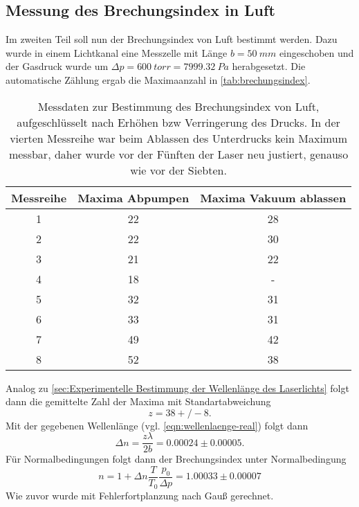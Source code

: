 \subsection{Messung des Brechungsindex in Luft}
\label{sec:Messung des Brechungsindex in Luft}
Im zweiten Teil soll nun der Brechungsindex von Luft bestimmt werden. Dazu wurde in
einem Lichtkanal eine Messzelle mit Länge $b = \SI{50}{mm}$ eingeschoben und der Gasdruck
wurde um $\Delta p = \SI{600}{torr} = \SI{7999,32}{Pa}$ herabgesetzt. Die automatische
Zählung ergab die Maximaanzahl in \autoref{tab:brechungsindex}.
\begin{table}
  \centering
  \caption{Messdaten zur Bestimmung des Brechungsindex von Luft, aufgeschlüsselt nach
  Erhöhen bzw Verringerung des Drucks. In der vierten Messreihe war beim Ablassen des
  Unterdrucks kein Maximum messbar, daher wurde vor der Fünften der Laser neu justiert,
  genauso wie vor der Siebten.}
  \label{tab:brechungsindex}
  \begin{tabular}{c c c}
  \toprule
  Messreihe & Maxima Abpumpen & Maxima Vakuum ablassen\\
  \midrule
  1 & 22 & 28 \\
  2 & 22 & 30 \\
  3 & 21 & 22 \\
  4 & 18 & -  \\
  5 & 32 & 31 \\
  6 & 33 & 31 \\
  7 & 49 & 42 \\
  8 & 52 & 38 \\
  \bottomrule
  \end{tabular}
\end{table}
Analog zu \autoref{sec:Experimentelle Bestimmung der Wellenlänge des Laserlichts} folgt
dann die gemittelte Zahl der Maxima mit Standartabweichung
\[
	z = 38+/-8.
\]
Mit der gegebenen Wellenlänge (vgl. \autoref{eqn:wellenlaenge-real}) folgt dann
\begin{equation}
	\Delta n = \frac{z \lambda}{2b} = 0.00024 \pm 0.00005.
\end{equation}
Für Normalbedingungen folgt dann der Brechungsindex unter Normalbedingung
\begin{equation}
	n = 1 + \Delta n \frac{T}{T_0} \frac{p_0}{\Delta p} = 1.00033 \pm 0.00007
\end{equation}
Wie zuvor wurde mit Fehlerfortplanzung nach Gauß gerechnet.
